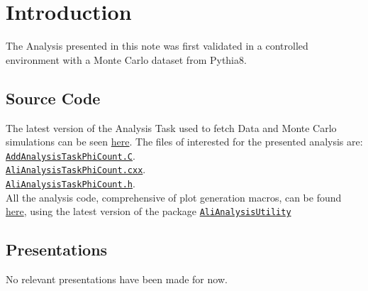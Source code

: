 \section{Introduction}
\label{sec:Introduction}

The Analysis presented in this note was first validated in a controlled environment with a Monte Carlo dataset from Pythia8.

\subsection{Source Code}
The latest version of the Analysis Task used to fetch Data and Monte Carlo simulations can be seen \href{https://github.com/alisw/AliPhysics/tree/master/PWGLF/RESONANCES/extra}{here}. The files of interested for the presented analysis are:\\
\href{https://github.com/alisw/AliPhysics/blob/master/PWGLF/RESONANCES/extra/AddAnalysisTaskPhiCount.C}{\texttt{AddAnalysisTaskPhiCount.C}}.\\
\href{https://github.com/alisw/AliPhysics/blob/master/PWGLF/RESONANCES/extra/AliAnalysisTaskPhiCount.cxx}{\texttt{AliAnalysisTaskPhiCount.cxx}}.\\
\href{https://github.com/alisw/AliPhysics/blob/master/PWGLF/RESONANCES/extra/AliAnalysisTaskPhiCount.h}{\texttt{AliAnalysisTaskPhiCount.h}}.\\
\indent All the analysis code, comprehensive of plot generation macros, can be found \href{https://github.com/Nikolajal/AliAnalysisPhiCount}{here}, using the latest version of the package \href{https://github.com/Nikolajal/AliAnalysisUtility.git}{\texttt{AliAnalysisUtility}}

\subsection{Presentations}
No relevant presentations have been made for now.